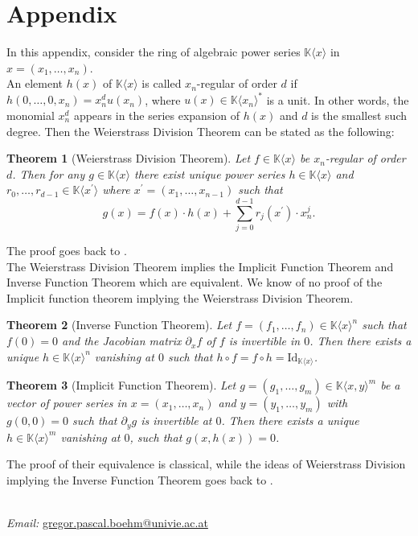 \documentclass[10pt, a4paper]{article}
\newtheorem{theorem}{Theorem}[section]
\theoremstyle{remark}
\theoremstyle{remark}
\begin{document}
\section{Appendix}\label{apendix}
In this appendix, consider the ring of algebraic power series $\mathbb{K}\langle x \rangle$ in $x=(x_1,\ldots,x_n)$.
\\An element $h(x)$ of $\mathbb{K}\langle x \rangle$ is called $x_n$-regular of order $d$ if $h(0,\ldots,0,x_n)=x_n^d u(x_n)$, where $u(x)\in \mathbb{K}\langle x_n\rangle ^*$ is a unit. In other words, the monomial $x_n^d$ appears in the series expansion of $h(x)$ and $d$ is the smallest such degree. Then the Weierstrass Division Theorem can be stated as the following:
\begin{theorem}[Weierstrass Division Theorem]\label{WDT}
Let $f\in \mathbb{K}\langle x \rangle$ be $x_n$-regular of order $d$. Then for any $g\in \mathbb{K}\langle x \rangle$ there exist unique power series $h\in \mathbb{K}\langle x \rangle$ and $r_0,\ldots,r_{d-1} \in \mathbb{K}\langle x^\prime \rangle$ where $x^\prime=(x_1,\ldots,x_{n-1})$ such that 
$$g(x)=f(x)\cdot h(x)+\sum_{j=0}^{d-1} r_j(x^\prime)\cdot x_n^j.$$
\end{theorem}
\noindent The proof goes back to \cite{Laf}.
\\The Weierstrass Division Theorem implies the Implicit Function Theorem and Inverse Function Theorem which are equivalent. We know of no proof of the Implicit function theorem implying the Weierstrass Division Theorem.
\begin{theorem}[Inverse Function Theorem]
    Let $f=(f_1,\ldots,f_n) \in \mathbb{K}\langle x \rangle^n$ such that $f(0)=0$ and the Jacobian matrix $\partial_xf$ of $f$ is invertible in $0$. Then there exists a unique $h\in \mathbb{K}\langle x \rangle^n$ vanishing at $0$ such that $h \circ f=f \circ h=\mathrm{Id}_{\mathbb{K}\langle x \rangle}$.
\end{theorem}
\begin{theorem}[Implicit Function Theorem]
  Let $g=(g_1,\ldots,g_m)\in \mathbb{K}\langle x,y \rangle^m$ be a vector of power series in $x=(x_1,\ldots,x_n)$ and $y=(y_1,\ldots,y_m)$ with $g(0,0)=0$ such that $\partial_yg$ is invertible at $0$. Then there exists a unique $h\in \mathbb{K}\langle x \rangle^m$ vanishing at $0$, such that $g(x,h(x))=0$.
\end{theorem}
\noindent The proof of their equivalence is classical, while the ideas of Weierstrass Division implying the Inverse Function Theorem goes back to \cite{doi:10.1080/00927879008824067}.
\fontsize{8}{9}\selectfont



\\\textit{Email:} \href{gregor.pascal.boehm@univie.ac.at}{gregor.pascal.boehm@univie.ac.at} 
\end{document}
